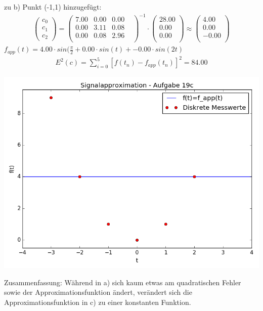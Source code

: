 	zu b) Punkt (-1,1) hinzugefügt: \newline
	\begin{align*}
	\left(\begin{matrix}c_0\\c_1\\c_2\end{matrix}\right) =
	\left(\begin{matrix}
			7.00 & 0.00 & 0.00 & \\
			0.00 & 3.11 & 0.08 & \\
			0.00 & 0.08 & 2.96 & \\
	\end{matrix}\right)^{-1} \cdot
	\left(\begin{matrix}
			28.00\\
			0.00\\
			0.00\\
	\end{matrix}\right) \approx
	\left(\begin{matrix}
			4.00\\
			0.00\\
			-0.00\\
	\end{matrix}\right)
	\end{align*}
	$f_{app}(t) = 4.00 \cdot sin(\frac{\pi}{2} + 0.00 \cdot sin(t) + -0.00 \cdot sin(2t) $\begin{align*}
			E^2(c) = \sum_{i=0}^5 \left[ f(t_n) - f_{app}(t_n)\right]^2 = 84.00
	\end{align*}

	\includegraphics[scale=0.8]{A19c2.png}

	Zusammenfassung: \newline
	Während in a) sich kaum etwas am quadratischen Fehler sowie der Approximationsfunktion ändert, verändert sich die Approximationsfunktion in c) zu einer konstanten Funktion.

